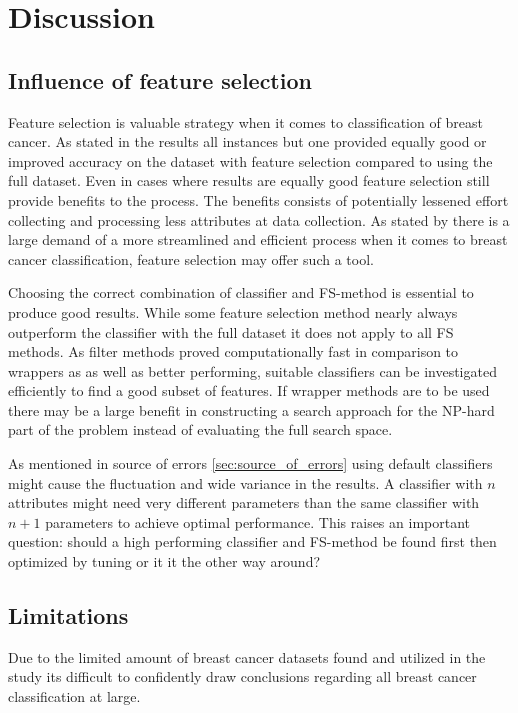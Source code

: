 \chapter{Discussion}

\section{Influence of feature selection}

Feature selection is valuable strategy when it comes to classification of breast cancer. As stated in the results all instances but one provided equally good or improved accuracy on the dataset with feature selection compared to using the full dataset. Even in cases where results are equally good feature selection still provide benefits to the process. The benefits consists of potentially lessened effort collecting and processing less attributes at data collection. As stated by \textcite{martei2018} there is a large demand of a more streamlined and efficient process when it comes to breast cancer classification, feature selection may offer such a tool.

Choosing the correct combination of classifier and FS-method is essential to produce good results. While some feature selection method nearly always outperform the classifier with the full dataset it does not apply to all FS methods. As filter methods proved computationally fast in comparison to wrappers as as well as better performing, suitable classifiers can be investigated efficiently to find a good subset of features. If wrapper methods are to be used there may be a large benefit in constructing a search approach for the NP-hard part of the problem instead of evaluating the full search space.

As mentioned in source of errors \ref{sec:source_of_errors} using default classifiers might cause the fluctuation and wide variance in the results. A classifier with $n$ attributes might need very different parameters than the same classifier with $n + 1$ parameters to achieve optimal performance. This raises an important question: should a high performing classifier and FS-method be found first then optimized by tuning or it it the other way around?


\section{Limitations}

Due to the limited amount of breast cancer datasets found and utilized in the study its difficult to confidently draw conclusions regarding all breast cancer classification at large.

